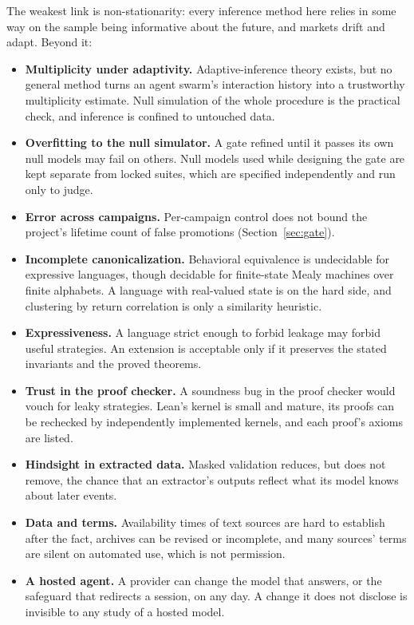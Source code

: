 \documentclass[11pt]{article}
\begin{document}
The weakest link is non-stationarity: every inference method here relies in some way on the sample being informative about the future, and markets drift and adapt. Beyond it:
\begin{itemize}
  \item \textbf{Multiplicity under adaptivity.} Adaptive-inference theory exists, but no general method turns an agent swarm's interaction history into a trustworthy multiplicity estimate. Null simulation of the whole procedure is the practical check, and inference is confined to untouched data.
  \item \textbf{Overfitting to the null simulator.} A gate refined until it passes its own null models may fail on others. Null models used while designing the gate are kept separate from locked suites, which are specified independently and run only to judge.
  \item \textbf{Error across campaigns.} Per-campaign control does not bound the project's lifetime count of false promotions (Section~\ref{sec:gate}).
  \item \textbf{Incomplete canonicalization.} Behavioral equivalence is undecidable for expressive languages, though decidable for finite-state Mealy machines over finite alphabets. A language with real-valued state is on the hard side, and clustering by return correlation is only a similarity heuristic.
  \item \textbf{Expressiveness.} A language strict enough to forbid leakage may forbid useful strategies. An extension is acceptable only if it preserves the stated invariants and the proved theorems.
  \item \textbf{Trust in the proof checker.} A soundness bug in the proof checker would vouch for leaky strategies. Lean's kernel is small and mature, its proofs can be rechecked by independently implemented kernels, and each proof's axioms are listed.
  \item \textbf{Hindsight in extracted data.} Masked validation reduces, but does not remove, the chance that an extractor's outputs reflect what its model knows about later events.
  \item \textbf{Data and terms.} Availability times of text sources are hard to establish after the fact, archives can be revised or incomplete, and many sources' terms are silent on automated use, which is not permission.
  \item \textbf{A hosted agent.} A provider can change the model that answers, or the safeguard that redirects a session, on any day. A change it does not disclose is invisible to any study of a hosted model.

\end{itemize}
\end{document}
